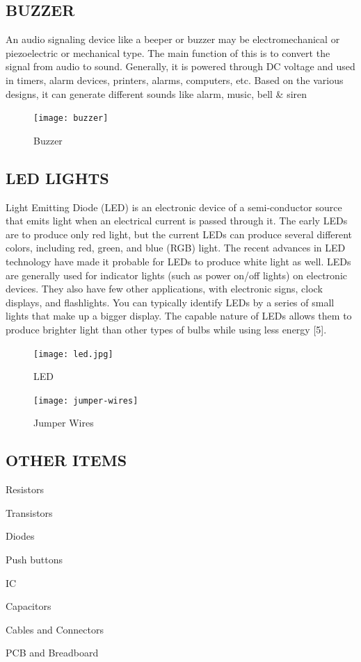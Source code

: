 \documentclass[conference]{IEEEtran}
\begin{document}
    \subsection{BUZZER}
    An audio signaling device like a beeper or buzzer may be electromechanical or piezoelectric or mechanical type. The main function of this is to convert the signal from audio to sound. Generally, it is powered through DC voltage and used in timers, alarm devices, printers, alarms, computers, etc. Based on the various designs, it can generate different sounds like alarm, music, bell & siren
    \begin{figure}[htbp]
        \centerline{\texttt{[image: buzzer]}}
        \caption{Buzzer}
        \label{fig}
    \end{figure}


    \subsection{LED LIGHTS}
    \paragraphA Light Emitting Diode (LED) is an electronic device of a
    semi-conductor source that emits light when an electrical
    current is passed through it. The early LEDs are to produce
    only red light, but the current LEDs can produce several
    different colors, including red, green, and blue (RGB) light.
    The recent advances in LED technology have made it
    probable for LEDs to produce white light as well. LEDs are
    generally used for indicator lights (such as power on/off
    lights) on electronic devices. They also have few other
    applications, with electronic signs, clock displays, and
    flashlights. You can typically identify LEDs by a series of small lights that make up a bigger display. The capable
    nature of LEDs allows them to produce brighter light than
    other types of bulbs while using less energy [5].

    \begin{figure}[htbp]
        \centerline{\texttt{[image: led.jpg]}}
        \caption{LED}
        \label{fig}
    \end{figure}

    \begin{figure}[htbp]
        \centerline{\texttt{[image: jumper-wires]}}
        \caption{Jumper Wires}
        \label{fig}
    \end{figure}


    \subsection{OTHER ITEMS}
    \itemize
    \item Resistors
    \item Transistors
    \item Diodes
    \item Push buttons
    \item IC
    \item Capacitors
    \item Cables and Connectors
    \item PCB and Breadboard
    \enditemize
\end{document}
